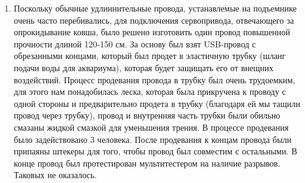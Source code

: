 \begin{enumerate}
\begin{enumerate}
        \item Поскольку обычные удлиннительные провода, устанавлемые на подъемнике очень часто перебивались, для подключения сервопривода, отвечающего за опрокидывание ковша, было решено изготовить один провод повышенной прочности длиной 120-150 см. За основу был взят USB-провод с обрезанными концами, который был продет в эластичную трубку (шланг подачи воды для аквариума), которая будет защищать его от внещних воздействий. Процесс продевания провода в трубку был очень трудоемким, для этого нам понадобилась леска, которая была прикручена к проводу с одной стороны и предварительно продета в трубку (благодаря ей мы тащили провод через трубку), провод и внутренняя часть трубки были обильно смазаны жидкой смазкой для уменьшения трения. В процессе продевания было задействовано 3 человека. После продевания к концам провода были припаяны штекеры для того, чтобы провод был совместим с остальными. В конце провод был протестирован мультитестером на наличие разрывов. Таковых не оказалось.
        \begin{figure}[H]
	  	  \begin{minipage}[h]{0.24\linewidth}
	  	  \end{minipage}
	  	  \hfill
	  	  \begin{minipage}[h]{0.24\linewidth}

\end{minipage}
\end{figure}
\end{enumerate}
\end{enumerate}
